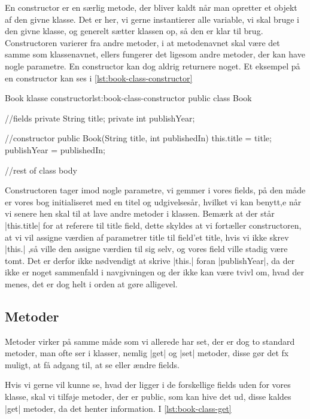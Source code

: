 
En constructor er en særlig metode, der bliver kaldt når man opretter
et objekt af den givne klasse. Det er her, vi gerne instantierer alle
variable, vi skal bruge i den givne klasse, og generelt sætter klassen
op, så den er klar til brug. Constructoren varierer fra andre metoder,
i at metodenavnet skal være det samme som klassenavnet, ellers
fungerer det ligesom andre metoder, der kan have nogle parametre. En
constructor kan dog aldrig returnere noget. Et eksempel på en
constructor kan ses i \autoref{lst:book-class-constructor}

\begin{JavaCode}{Book klasse constructor}{lst:book-class-constructor}
	public class Book {
		//fields
		private String title;
		private int publishYear;

		//constructor
		public Book(String title, int publishedIn) {
			this.title = title;
			publishYear = publishedIn;
		}

		//rest of class body
	}
\end{JavaCode}

Constructoren tager imod nogle parametre, vi gemmer i vores fields, på
den måde er vores bog initialiseret med en titel og udgivelsesår,
hvilket vi kan benytt,e når vi senere hen skal til at lave andre
metoder i klassen. Bemærk at der står \JavaInline|this.title| for at
referere til title field, dette skyldes at vi fortæller constructoren,
at vi vil assigne værdien af parametrer title til field'et title, hvis
vi ikke skrev \JavaInline|this.| ,så ville den assigne værdien til sig
selv, og vores field ville stadig være tomt. Det er derfor ikke
nødvendigt at skrive \JavaInline|this.| foran
\JavaInline|publishYear|, da der ikke er noget sammenfald i
navgivningen og der ikke kan være tvivl om, hvad der menes, det er dog
helt i orden at gøre alligevel.

\subsection{Metoder}

Metoder virker på samme måde som vi allerede har set, der er dog to
standard metoder, man ofte ser i klasser, nemlig \JavaInline|get| og
\JavaInline|set| metoder, disse gør det fx muligt, at få adgang til,
at se eller ændre fields.

Hvis vi gerne vil kunne se, hvad der ligger i de forskellige fields
uden for vores klasse, skal vi tilføje metoder, der er public, som kan
hive det ud, disse kaldes \JavaInline|get| metoder, da det henter
information. I \autoref{lst:book-class-get}

